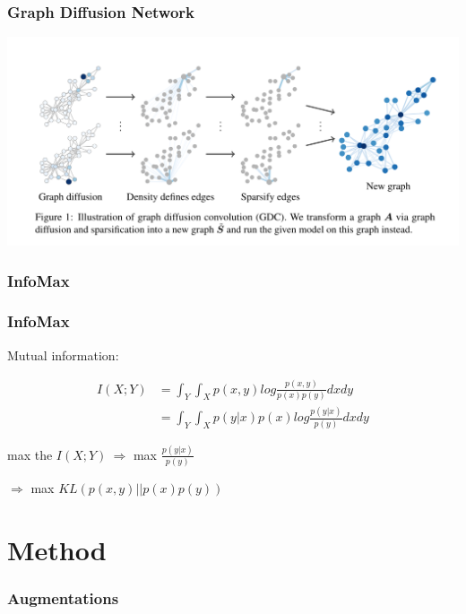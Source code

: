 \documentclass[UTF8]{beamer}
\begin{document}
    \begin{frame}
        \frametitle{Graph Diffusion Network}
    
        \includegraphics[width=\linewidth]{./images/diffusion.png}
    
    \end{frame}
    
    \subsubsection{InfoMax}

    \begin{frame}
        \frametitle{InfoMax}

        Mutual information:

        \begin{equation*}
            \begin{aligned}
                I(X;Y) &= \int_{Y}\int_{X}p(x,y)log\frac{p(x,y)}{p(x)p(y)}dxdy  \\
                &= \int_{Y}\int_{X}p(y|x)p(x)log\frac{p(y|x)}{p(y)}dxdy
            \end{aligned}
        \end{equation*}

        max the $I(X;Y)\ \Rightarrow$ max $\frac{p(y|x)}{p(y)}$
        \vspace{.5cm}

        $\Rightarrow$ max $KL(p(x,y)||p(x)p(y))$

    \end{frame}

    \section{Method}

    \subsubsection{Augmentations}
\end{document}
